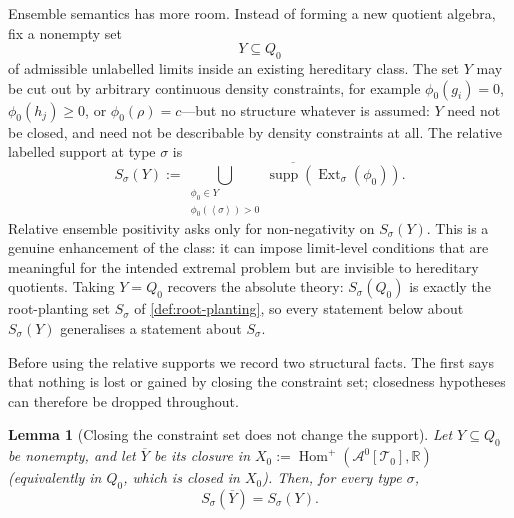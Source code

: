 \documentclass[11pt]{article}
\newtheorem{lemma}[lemma]{Lemma}
\theoremstyle{definition}
\newcommand{\R}{\mathbb{R}}
\newcommand{\A}{\mathcal{A}}
\newcommand{\T}{\mathcal{T}}
\newcommand{\Homp}{\operatorname{Hom}^{+}}
\newcommand{\Ext}{\operatorname{Ext}}
\newcommand{\supp}{\operatorname{supp}}
\newcommand{\brak}[1]{\left\langle #1\right\rangle}
\begin{document}
Ensemble semantics has more room.  Instead of forming a new quotient algebra, fix a
nonempty set
\[
  Y\subseteq Q_0
\]
of admissible unlabelled limits inside an existing hereditary class.  The set $Y$ may
be cut out by arbitrary continuous density constraints, for example
$\phi_0(g_i)=0$, $\phi_0(h_j)\ge0$, or $\phi_0(\rho)=c$---but no structure whatever is
assumed: $Y$ need not be closed, and need not be describable by density constraints at
all.  The relative labelled support at type $\sigma$ is
\[
  S_\sigma(Y):=
  \overline{
  \bigcup_{\substack{\phi_0\in Y\\ \phi_0(\brak\sigma)>0}}
  \supp(\Ext_\sigma(\phi_0))
  }.
\]
Relative ensemble positivity asks only for non-negativity on $S_\sigma(Y)$.  This is a
genuine enhancement of the class: it can impose limit-level conditions that are meaningful for
the intended extremal problem but are invisible to hereditary quotients.  Taking $Y=Q_0$
recovers the absolute theory: $S_\sigma(Q_0)$ is exactly the root-planting set $S_\sigma$
of \cref{def:root-planting}, so every statement below about $S_\sigma(Y)$ generalises a
statement about $S_\sigma$.

Before using the relative supports we record two structural facts.  The first says that
nothing is lost or gained by closing the constraint set; closedness hypotheses can
therefore be dropped throughout.

\begin{lemma}[Closing the constraint set does not change the support]\label{lem:relative-closure}
Let $Y\subseteq Q_0$ be nonempty, and let $\overline Y$ be its closure in
$X_0:=\Homp(\A^0[\T_0],\R)$ (equivalently in $Q_0$, which is closed in $X_0$).  Then, for
every type $\sigma$,
\[
  S_\sigma(\overline Y)=S_\sigma(Y).
\]
\end{lemma}
\end{document}
